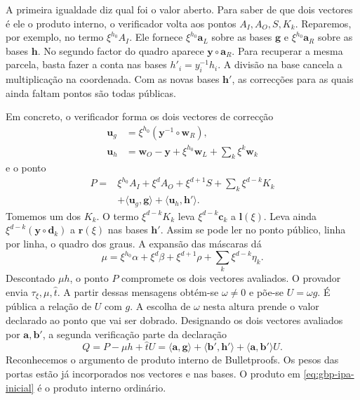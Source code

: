 A primeira igualdade diz qual foi o valor aberto. Para saber de que
dois vectores é ele o produto interno, o verificador volta aos pontos
\(A_I,A_O,S,K_k\). Reparemos, por exemplo, no termo
\(\xi^{h_0}A_I\). Ele fornece
\(\xi^{h_0}\boldsymbol a_L\) sobre as bases \(\boldsymbol g\) e
\(\xi^{h_0}\boldsymbol a_R\) sobre as bases \(\boldsymbol h\).
No segundo factor do quadro aparece \(\boldsymbol y\circ\boldsymbol a_R\).
Para recuperar a mesma parcela, basta fazer a conta nas bases
\(h'_i=y_i^{-1}h_i\). A divisão na base cancela a multiplicação
na coordenada. Com as novas bases \(\boldsymbol h'\), as correcções
para as quais ainda faltam pontos são todas públicas.

Em concreto, o verificador forma os dois vectores de correcção
\[
 \begin{aligned}
 \boldsymbol u_g&=\xi^{h_0}(\boldsymbol y^{-1}\circ\boldsymbol w_R),\\
 \boldsymbol u_h&=\boldsymbol w_O-\boldsymbol y
       +\xi^{h_0}\boldsymbol w_L+\sum_k\xi^k\boldsymbol w_k
 \end{aligned}
\]
e o ponto
\begin{equation}
 \begin{aligned}
 P={}&\xi^{h_0}A_I+\xi^d A_O+\xi^{d+1}S+
                      \sum_k\xi^{d-k} K_k\\
     &+\langle\boldsymbol u_g,\boldsymbol g\rangle+
                       \langle\boldsymbol u_h,\boldsymbol h'\rangle .
 \end{aligned}
 \label{eq:gbp-ponto-publico}
\end{equation}
Tomemos um dos \(K_k\). O termo \(\xi^{d-k}K_k\) leva
\(\xi^{d-k}\boldsymbol c_k\) a \(\boldsymbol l(\xi)\). Leva ainda
\(\xi^{d-k}(\boldsymbol y\circ\boldsymbol d_k)\) a
\(\boldsymbol r(\xi)\) nas bases \(\boldsymbol h'\).
Assim se pode ler no ponto público, linha por linha, o quadro dos graus.
A expansão das máscaras dá
\[
 \mu=\xi^{h_0}\alpha+\xi^d\beta+\xi^{d+1}\rho+
                               \sum_k\xi^{d-k}\eta_k .
\]
Descontado \(\mu h\), o ponto \(P\) compromete os dois vectores
avaliados. O provador envia \(\tau_\xi,\mu,\widehat t\). A partir
dessas mensagens obtém-se \(\omega\ne0\) e põe-se \(U=\omega g\).
É pública a relação de \(U\) com \(g\). A escolha de \(\omega\)
nesta altura prende o valor declarado ao ponto que vai ser dobrado.
Designando os dois vectores avaliados por \(\boldsymbol a,\boldsymbol b'\),
a segunda verificação parte da declaração
\begin{equation}
 Q=P-\mu h+\widehat t U
   =\langle\boldsymbol a,\boldsymbol g\rangle+
     \langle\boldsymbol b',\boldsymbol h'\rangle+
     \langle\boldsymbol a,\boldsymbol b'\rangle U .
 \label{eq:gbp-ipa-inicial}
\end{equation}
Reconhecemos o argumento de produto interno de Bulletproofs. Os pesos
das portas estão já incorporados nos vectores e nas bases. O produto
em \eqref{eq:gbp-ipa-inicial} é o produto interno ordinário.

